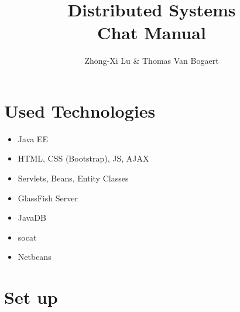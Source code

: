 \documentclass[11pt]{article}
\begin{document}
\author{Zhong-Xi Lu \& Thomas Van Bogaert}
\title{\textbf{Distributed Systems} \\ \Large{Chat Manual}}
\date{}
\maketitle

\section{Used Technologies}

\begin{itemize}
	\item Java EE
	\item HTML, CSS (Bootstrap), JS, AJAX
	\item Servlets, Beans, Entity Classes
	\item GlassFish Server
	\item JavaDB
	\item socat
	\item Netbeans
\end{itemize}

\section{Set up}
\end{document}
